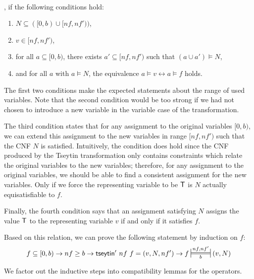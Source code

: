 \newcommand{\Frepr}[3]{\sdststile{\ensuremath{#3}}{\ensuremath{#1, #2}}}
\begin{definition}~\\
  \mnotec[tseytin_formula_repr]{$f \Frepr{nf}{nf'}{b} (v, N)$}, if the following conditions hold:
  \begin{enumerate}
    \item $N \subseteq ([0, b) \cup [nf, nf'))$,
    \item $v \in [nf, nf')$,
    \item for all $a \subseteq [0, b)$, there exists $a' \subseteq [nf, nf')$ such that $(a \cup a') \models N$,
  \item and for all $a$ with $a \models N$, the equivalence $a \models v \leftrightarrow a \models f$ holds.
  \end{enumerate}
\end{definition}

The first two conditions make the expected statements about the range of used variables. Note that the second condition would be too strong if we had not chosen to introduce a new variable in the variable case of the transformation.

The third condition states that for any assignment to the original variables $[0, b)$, we can extend this assignment to the new variables in range $[nf, nf')$ such that the CNF $N$ is satisfied. 
Intuitively, the condition does hold since the CNF produced by the Tseytin transformation only contains constraints which relate the original variables to the new variables; therefore, for any assignment to the original variables, we should be able to find a consistent assignment for the new variables. 
Only if we force the representing variable to be $\mathsf{T}$ is $N$ actually equisatisfiable to $f$.

Finally, the fourth condition says that an assignment satisfying $N$ assigns the value $\mathsf{T}$ to the representing variable $v$ if and only if it satisfies $f$. 

Based on this relation, we can prove the following statement by induction on $f$: 
\[f \subseteq [0, b) \rightarrow nf \ge b \rightarrow \tseytin'~nf~f = (v, N, nf') \rightarrow f \Frepr{nf}{nf'}{b} (v, N) \]

We factor out the inductive steps into compatibility lemmas for the operators. 

